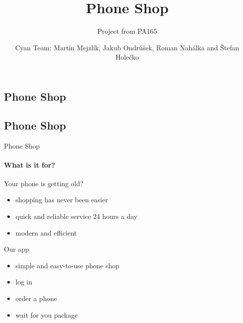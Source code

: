 \documentclass{beamer}
\title{Phone Shop} %
\subtitle{Project from PA165} %
\author{Cyan Team: Martin Mejzlík, Jakub Ondrúšek, Roman Nahálka and Štefan Holečko}
\newcommand{\comment}[1]{}
\begin{document}
  \frame{\maketitle}

  \AtBeginSection[]{%
  
  \comment{
    \begin{frame}<beamer>
      \frametitle{Outline for Section \thesection}
      \tableofcontents[currentsection]
    \end{frame}
    
  }
    }
    


  \begin{darkframes}
    \section{Phone Shop}

	\subsection{Phone Shop}
	\begin{frame}{Phone Shop}
	\framesubtitle{What is it for?}%
	  Your phone is getting old?
      \begin{itemize}
          \item shopping has never been easier
          \item quick and reliable service 24 hours a day
          \item modern and efficient
      \end{itemize}
      Our app
      \begin{itemize}
          \item simple and easy-to-use phone shop
          \item log in
          \item order a phone
          \item wait for you package
      \end{itemize}
    \end{frame}  
		

\end{darkframes}
\end{document}

